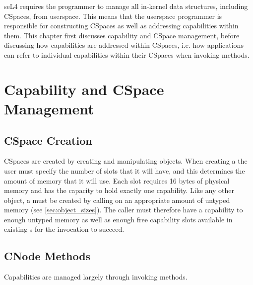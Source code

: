 seL4 requires the programmer to manage all in-kernel data structures,
including C\-Spaces, from userspace. This means that the userspace
programmer is responsible for constructing CSpaces as well as
addressing capabilities within them.  This chapter first discusses
capability and CSpace management, before discussing how capabilities
are addressed within CSpaces, i.e. how applications can refer to
individual capabilities within their CSpaces when invoking methods.

\section{Capability and CSpace Management}

\subsection{CSpace Creation}

CSpaces are created by creating and manipulating  objects.
When creating a  the user must specify the number of slots
that it will have, and this determines the amount of memory that it
will use. Each slot requires 16 bytes of physical memory and has the
capacity to hold exactly one capability. Like any other object, a
 must be created by calling
 on an appropriate
amount of untyped memory (see \autoref{sec:object_sizes}).  The caller
must therefore have a capability to enough untyped memory as well as
enough free capability slots available in existing s for
the  invocation to
succeed.

\subsection{CNode Methods}
\label{sec:cnode-ops}

Capabilities are managed largely through invoking  methods.

